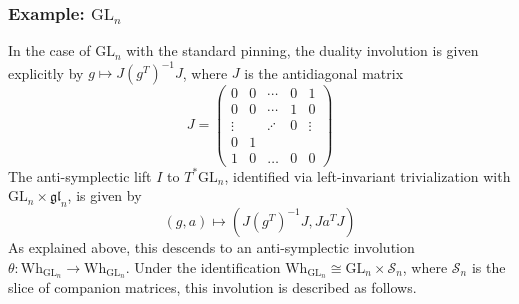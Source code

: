 \documentclass[11pt]{article}
\theoremstyle{definition}
\theoremstyle{plain}
\theoremstyle{remark}
\newcommand{\GL}{\mathrm{GL}}
\newcommand{\gl}{\mathfrak{gl}}
\begin{document}
            \subsubsection{Example: \texorpdfstring{$\GL_n$}{GLn}}
            In the case of $\GL_n$ with the standard pinning, the duality involution is given explicitly by $g \mapsto J(g^T)^{-1}J$, where $J$ is the antidiagonal matrix
            \begin{equation}\label{eq-matrixantidiagonal}
                J = \begin{pmatrix*}
                    0 & 0 & \cdots & 0 & 1 \\
                    0 &  0 & \cdots & 1 & 0 \\
                    \vdots & & \iddots & 0 & \vdots\\
                    0 & 1 & & \\
                    1 & 0 & \dots & 0 & 0
                \end{pmatrix*}
            \end{equation}
            The anti-symplectic lift $I$ to $T^*\GL_n$, identified via left-invariant trivialization with $\GL_n \times \gl_n$, is given by
            \[
                (g,a) \mapsto (J(g^T)^{-1}J, Ja^TJ)
            \]
            As explained above, this descends to an anti-symplectic involution $\theta\colon \mathrm{Wh}_{\GL_n} \to \mathrm{Wh}_{\GL_n}$. Under the identification $\mathrm{Wh}_{\GL_n} \cong \GL_n \times \mathcal{S}_n$, where $\mathcal{S}_n$ is the slice of companion matrices, this involution is described as follows. 
            
\end{document}
